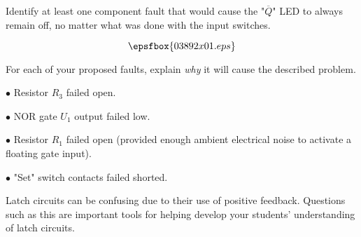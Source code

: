 

Identify at least one component fault that would cause the "$\overline{Q}$" LED to always remain off, no matter what was done with the input switches.

$$\epsfbox{03892x01.eps}$$

For each of your proposed faults, explain {\it why} it will cause the described problem.







\medskip
\item{$\bullet$} Resistor $R_3$ failed open.
\vskip 5pt
\item{$\bullet$} NOR gate $U_1$ output failed low.
\vskip 5pt
\item{$\bullet$} Resistor $R_1$ failed open (provided enough ambient electrical noise to activate a floating gate input).
\vskip 5pt
\item{$\bullet$} "Set" switch contacts failed shorted.
\medskip







Latch circuits can be confusing due to their use of positive feedback.  Questions such as this are important tools for helping develop your students' understanding of latch circuits.




